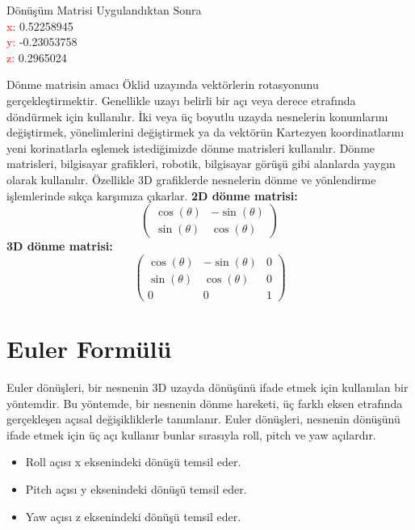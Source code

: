 \documentclass[12pt, a4paper]{article}
\begin{document}
\begin{center}
	Dönüşüm Matrisi Uygulandıktan Sonra \\
	\textcolor{red}{x:} 0.52258945 \\
	\textcolor{red}{y:} -0.23053758 \\
	\textcolor{red}{z:} 0.2965024
\end{center}
Dönme matrisin amacı Öklid uzayında vektörlerin rotasyonunu gerçekleştirmektir. Genellikle uzayı belirli bir açı veya derece etrafında döndürmek için kullanılır.
İki veya üç boyutlu uzayda nesnelerin konumlarını değiştirmek, yönelimlerini değiştirmek ya da vektörün Kartezyen koordinatlarını yeni korinatlarla eşlemek istediğimizde dönme matrisleri kullanılır.
Dönme matrisleri, bilgisayar grafikleri, robotik, bilgisayar görüşü gibi alanlarda yaygın olarak kullanılır. Özellikle 3D grafiklerde nesnelerin dönme ve yönlendirme işlemlerinde sıkça karşımıza çıkarlar.\newline \newline
\textbf{2D dönme matrisi:}
\[
\begin{pmatrix}
	\cos(\theta) & -\sin(\theta) \\
	\sin(\theta) & \cos(\theta)
\end{pmatrix}
\]
\newline
\textbf{3D dönme matrisi:}
\[
\begin{pmatrix}
	\cos(\theta) & -\sin(\theta) & 0 \\
	\sin(\theta) & \cos(\theta) & 0 \\
	0 & 0 & 1
\end{pmatrix}
\]
\section{Euler Formülü}
Euler dönüşleri, bir nesnenin 3D uzayda dönüşünü ifade etmek için kullanılan bir yöntemdir. Bu yöntemde, bir nesnenin dönme hareketi, üç farklı eksen etrafında gerçekleşen açısal değişikliklerle tanımlanır. Euler dönüşleri, nesnenin dönüşünü ifade etmek için üç açı kullanır bunlar sırasıyla roll, pitch ve yaw açılardır.

\begin{itemize}
	\item Roll açısı x eksenindeki dönüşü temsil eder.
	\item Pitch açısı y eksenindeki dönüşü temsil eder.
	\item Yaw açısı z eksenindeki dönüşü temsil eder. 
\end{itemize}
\end{document}
